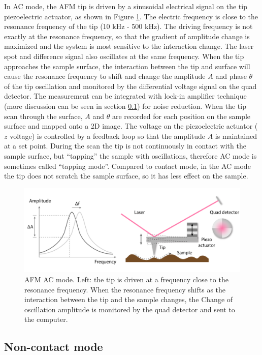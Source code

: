 \documentclass[pdflatex, sectionletters, 12pt]{pittetd}    %
\begin{document}
In AC mode, the AFM tip is driven by a sinusoidal electrical signal on the tip piezoelectric actuator, as shown in Figure \ref{FIG:ACAFM}. The electric frequency is close to the resonance frequency of the tip (10 kHz - 500 kHz). The driving frequency is not exactly at the resonance frequency, so that the gradient of amplitude change is maximized and the system is most sensitive to the interaction change. The laser spot and difference signal also oscillates at the same frequency. When the tip approaches the sample surface, the interaction between the tip and surface will cause the resonance frequency to shift and change the amplitude $A$ and phase $\theta$ of the tip oscillation and monitored by the differential voltage signal on the quad detector. The measurement can be integrated with lock-in amplifier technique (more discussion can be seen in section \ref{}) for noise reduction. When the tip scan through the surface, $A$ and $\theta$ are recorded for each position on the sample surface and mapped onto a 2D image. The voltage on the piezoelectric actuator ($z$ voltage) is controlled by a feedback loop so that the amplitude $A$ is maintained at a set point. During the scan the tip is not continuously in contact with the sample surface, but ``tapping'' the sample with oscillations, therefore AC mode is sometimes called ``tapping mode''. Compared to contact mode, in the AC mode the tip does not scratch the sample surface, so it has less effect on the sample. 

\begin{figure}[h!]
	\centering
	\includegraphics[width=1.0\textwidth]{Drawing/ACAFM.pdf}
	\caption{AFM AC mode. Left: the tip is driven at a frequency close to the resonance frequency. When the resonance frequency shifts as the interaction between the tip and the sample changes, the Change of oscillation amplitude is monitored by the quad detector and sent to the computer.}
	\label{FIG:ACAFM}
\end{figure}

\subsection{Non-contact mode}
\end{document}
